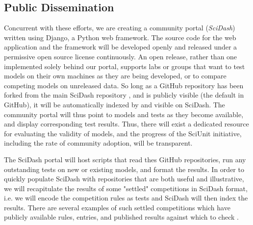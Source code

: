 \documentclass[11pt,letterpaper]{article}
\begin{document}
\subsection{Public Dissemination}
Concurrent with these efforts, we are creating a community portal (\textit{SciDash}) written using Django, a Python web framework.  The source code for the web application and the framework will be developed openly and released under a permissive open source license continuously. An open release, rather than one implemented solely behind our portal, supports labs or groups that want to test models on their own machines as they are being developed, or to compare competing models on unreleased data.  So long as a GitHub repository has been forked from the main SciDash repository \cite{scidash_repo_url}, and is publicly visible (the default in GitHub), it will be automatically indexed by and visible on SciDash. The community portal will thus point to models and tests as they become available, and display corresponding test results.  Thus, there will exist a dedicated resource for evaluating the validity of models, and the progress of the SciUnit initiative, including the rate of community adoption, will be transparent.  

The SciDash portal will host scripts that read thes GitHub repositories, run any outstanding tests on new or existing models, and format the results.  In order to quickly populate SciDash with repositories that are both useful and illustrative, we will recapitulate the results of some "settled" competitions in SciDash format, i.e. we will encode the competition rules as tests and SciDash will then index the results.  There are several examples of such settled competitions which have publicly available rules, entries, and published results against which to check \cite{jolivet_quantitative_2008}.  
\end{document}
